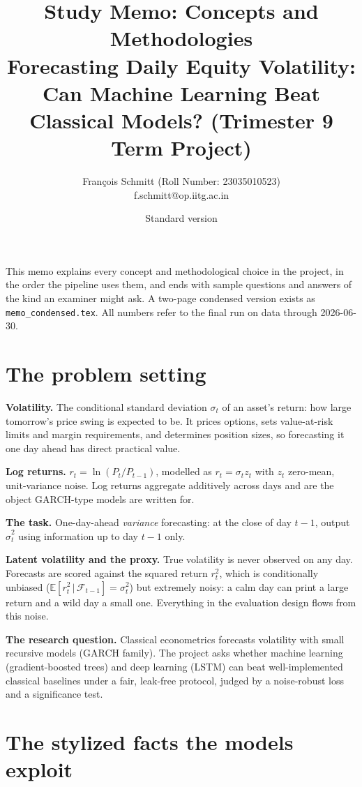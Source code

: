 \documentclass[a4paper,11pt]{article}
\title{\bfseries Study Memo: Concepts and Methodologies\\
\large Forecasting Daily Equity Volatility: Can Machine Learning Beat Classical Models? (Trimester 9 Term Project)}
\author{François Schmitt (Roll Number: 23035010523)\\
\ttfamily f.schmitt@op.iitg.ac.in}
\date{Standard version}
\newcommand{\term}[1]{\textbf{#1}}
\begin{document}
\maketitle

\noindent This memo explains every concept and methodological choice in the project, in the order the pipeline uses them, and ends with sample questions and answers of the kind an examiner might ask. A two-page condensed version exists as \texttt{memo\_condensed.tex}. All numbers refer to the final run on data through 2026-06-30.

\section{The problem setting}

\term{Volatility.} The conditional standard deviation $\sigma_t$ of an asset's return: how large tomorrow's price swing is expected to be. It prices options, sets value-at-risk limits and margin requirements, and determines position sizes, so forecasting it one day ahead has direct practical value.

\term{Log returns.} $r_t=\ln(P_t/P_{t-1})$, modelled as $r_t=\sigma_t z_t$ with $z_t$ zero-mean, unit-variance noise. Log returns aggregate additively across days and are the object GARCH-type models are written for.

\term{The task.} One-day-ahead \emph{variance} forecasting: at the close of day $t-1$, output $\hat\sigma_t^2$ using information up to day $t-1$ only.

\term{Latent volatility and the proxy.} True volatility is never observed on any day. Forecasts are scored against the squared return $r_t^2$, which is conditionally unbiased ($\mathbb{E}[r_t^2\,|\,\mathcal{F}_{t-1}]=\sigma_t^2$) but extremely noisy: a calm day can print a large return and a wild day a small one. Everything in the evaluation design flows from this noise.

\term{The research question.} Classical econometrics forecasts volatility with small recursive models (GARCH family). The project asks whether machine learning (gradient-boosted trees) and deep learning (LSTM) can beat well-implemented classical baselines under a fair, leak-free protocol, judged by a noise-robust loss and a significance test.

\section{The stylized facts the models exploit}
\end{document}
